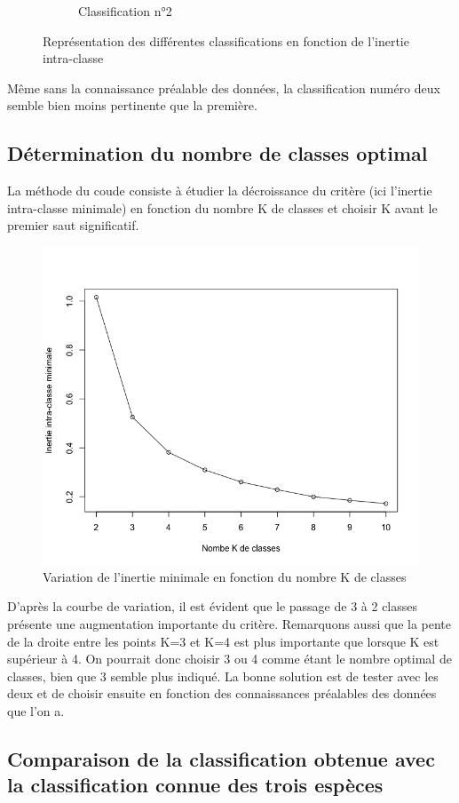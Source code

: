 \documentclass[a4paper,10pt]{report}
\begin{document}
\begin{figure}[H]
\begin{subfigure}[b]{0.5\linewidth}
		\caption{\small Classification n°2}
		\label{fig:3-1-2-iris-kmeans-3-max-inertie}
	\end{subfigure}%
	\caption{\small Représentation des différentes classifications en fonction de l'inertie intra-classe}
	\label{fig:3-1-2-Representation-Differentes-classifications-obtenues}
\end{figure}

Même sans la connaissance préalable des données, la classification numéro deux semble bien moins pertinente que la première.


\subsection{Détermination du nombre de classes optimal}

La méthode du coude consiste à étudier la décroissance du critère (ici l'inertie intra-classe minimale) en fonction du nombre K de classes et choisir K avant le premier saut significatif.

\begin{figure}[H]
	\centering
	\captionsetup{justification=centering, margin=4cm}
	\includegraphics[width=.3\linewidth]{img/3-1-3-variation-inertie-minimale-en-fonction-de-K}
	\caption{\small Variation de l'inertie minimale en fonction du nombre K de classes}
	\label{fig:3-1-3-variation-inertie-minimale-en-fonction-de-K}
\end{figure}

D'après la courbe de variation, il est évident que le passage de 3 à 2 classes présente une augmentation importante du critère. Remarquons aussi que la pente de la droite entre les points K=3 et K=4 est plus importante que lorsque K est supérieur à 4.
On pourrait donc choisir 3 ou 4 comme étant le nombre optimal de classes, bien que 3 semble plus indiqué. La bonne solution est de tester avec les deux et de choisir ensuite en fonction des connaissances préalables des données que l'on a.

\subsection{Comparaison de la classification obtenue avec la classification connue des trois espèces}
\end{document}
